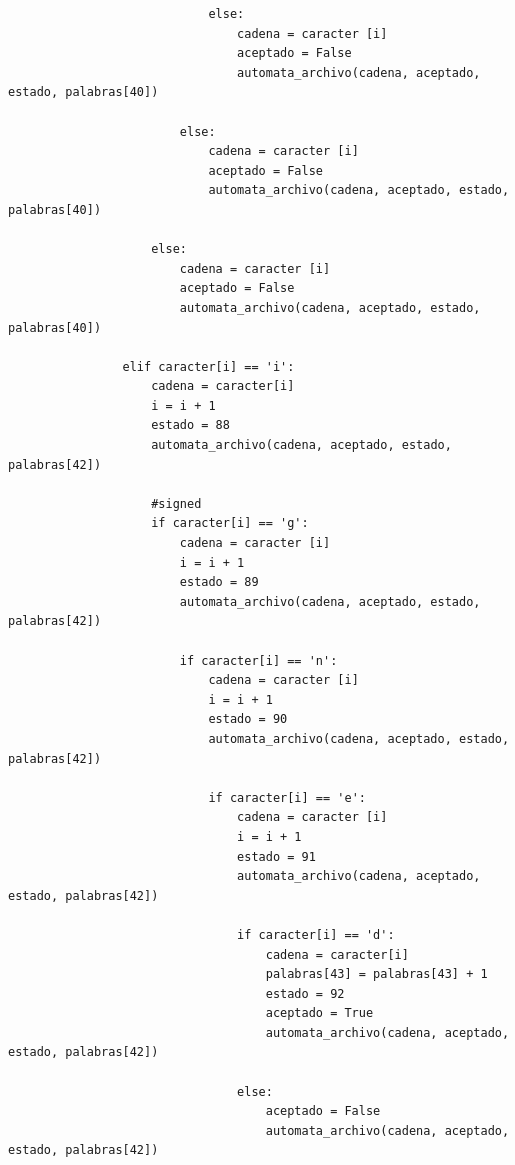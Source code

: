 \documentclass{article}
\begin{document}
\begin{flushleft}
\begin{lstlisting}
                            else:
                                cadena = caracter [i]
                                aceptado = False
                                automata_archivo(cadena, aceptado, estado, palabras[40])
                        
                        else:
                            cadena = caracter [i]
                            aceptado = False
                            automata_archivo(cadena, aceptado, estado, palabras[40])
                            
                    else:
                        cadena = caracter [i]
                        aceptado = False
                        automata_archivo(cadena, aceptado, estado, palabras[40])
                        
                elif caracter[i] == 'i':
                    cadena = caracter[i]
                    i = i + 1
                    estado = 88
                    automata_archivo(cadena, aceptado, estado, palabras[42])
                    
                    #signed
                    if caracter[i] == 'g':
                        cadena = caracter [i]
                        i = i + 1
                        estado = 89
                        automata_archivo(cadena, aceptado, estado, palabras[42])              
                        
                        if caracter[i] == 'n':
                            cadena = caracter [i]
                            i = i + 1
                            estado = 90
                            automata_archivo(cadena, aceptado, estado, palabras[42])
                            
                            if caracter[i] == 'e':
                                cadena = caracter [i]
                                i = i + 1
                                estado = 91
                                automata_archivo(cadena, aceptado, estado, palabras[42])
                                
                                if caracter[i] == 'd':
                                    cadena = caracter[i]
                                    palabras[43] = palabras[43] + 1
                                    estado = 92
                                    aceptado = True
                                    automata_archivo(cadena, aceptado, estado, palabras[42])
                                    
                                else:
                                    aceptado = False
                                    automata_archivo(cadena, aceptado, estado, palabras[42])
                            

\end{lstlisting}
\end{flushleft}
\end{document}
